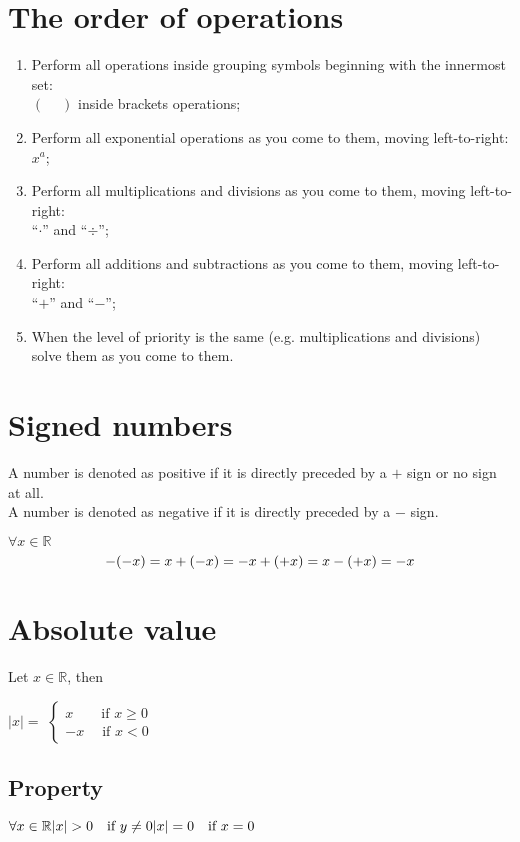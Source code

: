 \documentclass{article}
\begin{document}
\section{The order of operations}
\begin{enumerate}
    \item Perform all operations inside grouping symbols beginning with the innermost set:\\
        $\left(\phantom{-}\right)$ inside brackets operations;
    \item Perform all exponential operations as you come to them, moving left-to-right:\\
        $x^a$;
    \item Perform all multiplications and divisions as you come to them, moving left-to-right:\\
        ``$\cdot$'' and ``$\div$'';
    \item Perform all additions and subtractions as you come to them, moving left-to-right:\\
        ``$+$'' and ``$-$'';
    \item When the level of priority is the same (e.g. multiplications and divisions) solve them as you come to them.
\end{enumerate}

\section{Signed numbers}
A number is denoted as positive if it is directly preceded by a $+$ sign or no sign at all.\\
A number is denoted as negative if it is directly preceded by a $-$ sign.

$\forall x \in \mathbb{R}$
\[-(-x)=x\\
+(-x)=-x\\
+(+x)=x\\
-(+x)=-x\]

\section{Absolute value}
Let $x \in \mathbb{R}$, then

$|x|=$
$\begin{cases}
    x \qquad \text{if } x \geq 0\\
    -x \;\quad \text{if } x < 0
\end{cases}$

\subsection{Property}
$\forall x \in \mathbb{R}\\
|x|>0 \quad \text{if } y \neq 0\\
|x|=0 \quad \text{if } x=0$
\end{document}
